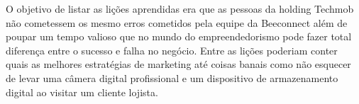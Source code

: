 O objetivo de listar as lições aprendidas era que as pessoas da holding Techmob não cometessem os mesmo erros cometidos pela equipe da Beeconnect além de poupar um tempo valioso que no mundo do empreendedorismo pode fazer total diferença entre o sucesso e falha no negócio. Entre as lições poderiam conter quais as melhores estratégias de marketing até coisas banais como não esquecer de levar uma câmera digital profissional e um dispositivo de armazenamento digital ao visitar um cliente lojista.